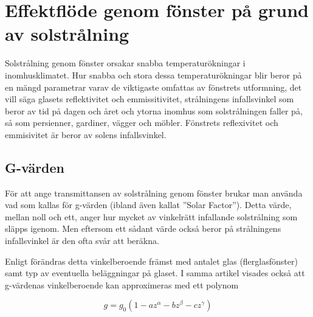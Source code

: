 \section{Effektflöde genom fönster på grund av solstrålning}

Solstrålning genom fönster orsakar snabba temperaturökningar i inomhusklimatet. Hur snabba och stora dessa temperaturökningar blir beror på en mängd parametrar varav de viktigaste omfattas av fönstrets utformning, det vill säga glasets reflektivitet och emmissitivitet, strålningens infallsvinkel som beror av tid på dagen och året och ytorna inomhus som solstrålningen faller på, så som persienner, gardiner, vägger och möbler. Fönstrets reflexivitet och emmisivitet är beror av solens infallsvinkel.


\subsection{G-värden}\label{gvalue}

För att ange transmittansen av solstrålning genom fönster brukar man använda vad som kallas för g-värden (ibland även kallat ''Solar Factor''). Detta värde, mellan noll och ett, anger hur mycket av vinkelrätt infallande solstrålning som släpps igenom. Men eftersom ett sådant värde också beror på strålningens infallsvinkel är den ofta svår att beräkna.

Enligt \cite{karlssonroos99} förändras detta vinkelberoende främst med antalet glas (flerglasfönster) samt typ av eventuella beläggningar på glaset. I samma artikel visades också att g-värdenas vinkelberoende kan approximeras med ett polynom

\begin{equation}\label{eq:radiationwindowstheory:gvalue}
g = g_0 \left( 1 - az^{\alpha} - bz^{\beta} - cz^{\gamma} \right)
\end{equation}

